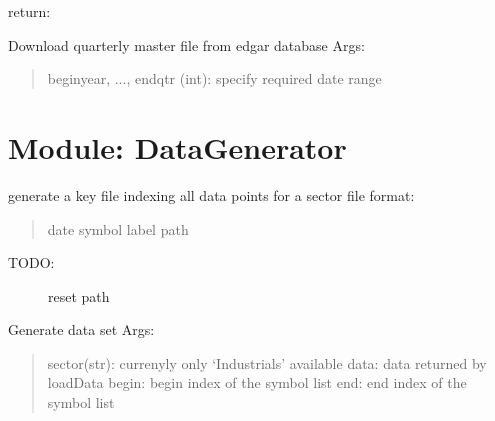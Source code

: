 \documentclass[letterpaper,10pt,english]{sphinxmanual}
\begin{document}
\begin{fulllineitems}
\begin{fulllineitems}
return:

\end{fulllineitems}


\begin{fulllineitems}
\label{utils:form10DB.Form10Manager.updateQuarterMasterFile}
Download quarterly master file from edgar database
Args:
\begin{quote}

beginyear, ..., endqtr (int): specify required date range
\end{quote}

\end{fulllineitems}


\end{fulllineitems}



\chapter{Module: DataGenerator}
\label{DataGenerator:module-DataGenerator}\label{DataGenerator:module-datagenerator}\label{DataGenerator::doc}

\begin{fulllineitems}
\label{DataGenerator:DataGenerator.DatabaseIndex}
generate a key file indexing all data points for a sector
file format:
\begin{quote}

date    symbol  label   path
\end{quote}
\begin{description}
\item[{TODO:}] \leavevmode
reset path

\end{description}

\end{fulllineitems}


\begin{fulllineitems}
\label{DataGenerator:DataGenerator.GenerateDataset}
Generate data set
Args:
\begin{quote}

sector(str): currenyly only `Industrials' available
data: data returned by loadData
begin: begin index of the symbol list
end:    end index of the symbol list
\end{quote}

\end{fulllineitems}
\end{document}
